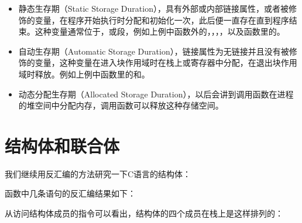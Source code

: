 \begin{itemize}

\item 静态生存期（Static Storage Duration），具有外部或内部链接属性，或者被修饰的变量，在程序开始执行时分配和初始化一次，此后便一直存在直到程序结束。这种变量通常位于，或段，例如上例中函数外的，，，，以及函数里的。

\item 自动生存期（Automatic Storage Duration），链接属性为无链接并且没有被修饰的变量，这种变量在进入块作用域时在栈上或寄存器中分配，在退出块作用域时释放。例如上例中函数里的和。

\item 动态分配生存期（Allocated Storage Duration），以后会讲到调用函数在进程的堆空间中分配内存，调用函数可以释放这种存储空间。
\end{itemize}




\section{结构体和联合体}
%
我们继续用反汇编的方法研究一下C语言的结构体：





函数中几条语句的反汇编结果如下：




从访问结构体成员的指令可以看出，结构体的四个成员在栈上是这样排列的：




